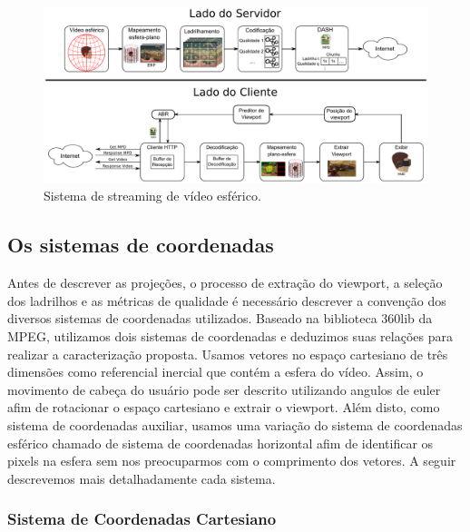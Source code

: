 \begin{figure}[h]
	\centering
	\includegraphics[width=0.9\linewidth]{"fig/Streaming - client-side and server-side.pdf"}
	\caption{Sistema de streaming de vídeo esférico.}
	\label{fig:streaming_client_server}
\end{figure}


\subsection{Os sistemas de coordenadas}

Antes de descrever as projeções, o processo de extração do viewport, a seleção dos ladrilhos e as métricas de qualidade é necessário descrever a convenção dos diversos sistemas de coordenadas utilizados. Baseado na biblioteca 360lib da MPEG, utilizamos dois sistemas de coordenadas e deduzimos suas relações para realizar a caracterização proposta. Usamos vetores no espaço cartesiano de três dimensões como referencial inercial que contém a esfera do vídeo. Assim, o movimento de cabeça do usuário pode ser descrito utilizando angulos de euler afim de rotacionar o espaço cartesiano e extrair o viewport.  Além disto, como sistema de coordenadas auxiliar, usamos uma variação do sistema de coordenadas esférico chamado de sistema de coordenadas horizontal afim de identificar os pixels na esfera sem nos preocuparmos com o comprimento dos vetores. A seguir descrevemos mais detalhadamente cada sistema. 

\subsubsection{Sistema de Coordenadas Cartesiano}

